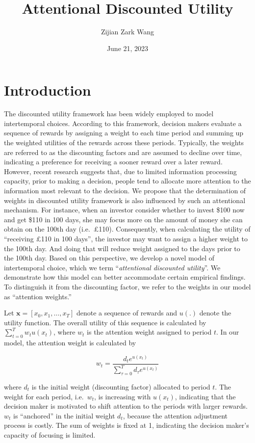 \documentclass[
  12pt,
]{article}
\title{Attentional Discounted Utility}
\author{Zijian Zark Wang}
\date{June 21, 2023}
\begin{document}
\maketitle

\hypertarget{introduction}{%
\section{Introduction}\label{introduction}}

The discounted utility framework has been widely employed to model
intertemporal choices. According to this framework, decision makers
evaluate a sequence of rewards by assigning a weight to each time period
and summing up the weighted utilities of the rewards across these
periods. Typically, the weights are referred to as the discounting
factors and are assumed to decline over time, indicating a preference
for receiving a sooner reward over a later reward. However, recent
research suggests that, due to limited information processing capacity,
prior to making a decision, people tend to allocate more attention to
the information most relevant to the decision. We propose that the
determination of weights in discounted utility framework is also
influenced by such an attentional mechanism. For instance, when an
investor consider whether to invest \$100 now and get \$110 in 100 days,
she may focus more on the amount of money she can obtain on the 100th
day (i.e.~£110). Consequently, when calculating the utility of
``receiving £110 in 100 days'', the investor may want to assign a higher
weight to the 100th day. And doing that will reduce weight assigned to
the days prior to the 100th day. Based on this perspective, we develop a
novel model of intertemporal choice, which we term ``\emph{attentional
discounted utility}''. We demonstrate how this model can better
accommodate certain empirical findings. To distinguish it from the
discounting factor, we refer to the weights in our model as ``attention
weights.''

Let \(\textbf{x} = [x_0, x_1, …, x_T]\) denote a sequence of rewards and
\(u(.)\) denote the utility function. The overall utility of this
sequence is calculated by \(\sum_{t=0}^T w_t u(x_t)\), where \(w_t\) is
the attention weight assigned to period \(t\). In our model, the
attention weight is calculated by

\[
w_t = \frac{d_t e^{u(x_t)}}{\sum_{\tau=0}^T d_\tau e^{u(x_t)}}
\]

where \(d_t\) is the initial weight (discounting factor) allocated to
period \(t\). The weight for each period, i.e.~\(w_t\), is increasing
with \(u(x_t)\), indicating that the decision maker is motivated to
shift attention to the periods with larger rewards. \(w_t\) is
``anchored'' in the initial weight \(d_t\), because the attention
adjustment process is costly. The sum of weights is fixed at 1,
indicating the decision maker's capacity of focusing is limited.
\end{document}
